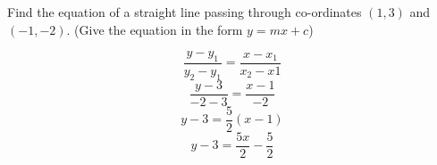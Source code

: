 \question Find the equation of a straight line passing through co-ordinates 
$(1,3)$ and $(-1,-2)$. (Give the equation in the form $y = mx+c$)
\begin{solution}
	\[
		\frac{y-y_{1}}{y_{2}-y_{1}} = \frac{x-x_{1}}{x_{2}-x{1}}
	\]
	\[
		\frac{y-3}{-2-3} = \frac{x-1}{-2}
	\]
	\[
		y-3 = \frac{5}{2} (x-1)
	\]
	\[
		y-3 = \frac{5x}{2} - \frac{5}{2}
	\]
\end{solution}

